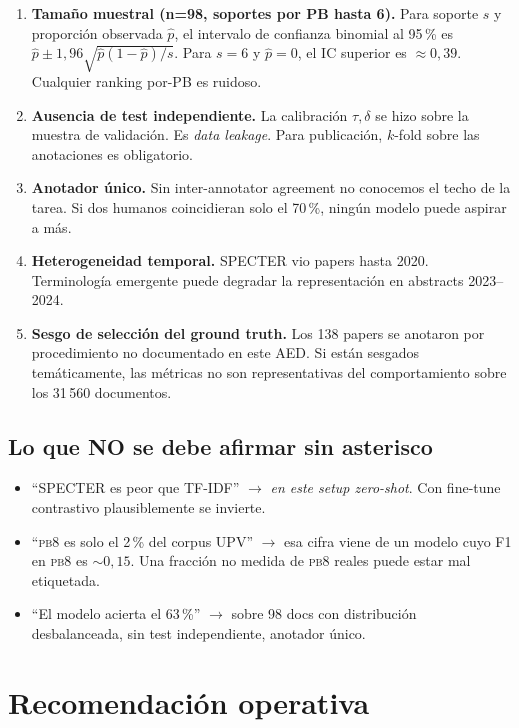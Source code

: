 \documentclass[11pt,a4paper]{article}
\newcommand{\pb}[1]{\textsc{pb#1}}
\begin{document}
\begin{enumerate}
\item \textbf{Tamaño muestral (n=98, soportes por PB hasta 6).} Para soporte $s$ y proporción observada $\hat{p}$, el intervalo de confianza binomial al 95\,\% es $\hat{p} \pm 1{,}96\sqrt{\hat{p}(1-\hat{p})/s}$. Para $s=6$ y $\hat{p}=0$, el IC superior es $\approx 0{,}39$. Cualquier ranking por-PB es ruidoso.
\item \textbf{Ausencia de test independiente.} La calibración $\tau, \delta$ se hizo sobre la muestra de validación. Es \emph{data leakage}. Para publicación, $k$-fold sobre las anotaciones es obligatorio.
\item \textbf{Anotador único.} Sin inter-annotator agreement no conocemos el techo de la tarea. Si dos humanos coincidieran solo el 70\,\%, ningún modelo puede aspirar a más.
\item \textbf{Heterogeneidad temporal.} SPECTER vio papers hasta 2020. Terminología emergente puede degradar la representación en abstracts 2023--2024.
\item \textbf{Sesgo de selección del ground truth.} Los 138 papers se anotaron por procedimiento no documentado en este AED. Si están sesgados temáticamente, las métricas no son representativas del comportamiento sobre los 31\,560 documentos.
\end{enumerate}

\subsection{Lo que NO se debe afirmar sin asterisco}

\begin{itemize}
\item ``SPECTER es peor que TF-IDF'' $\to$ \emph{en este setup zero-shot}. Con fine-tune contrastivo plausiblemente se invierte.
\item ``\pb8 es solo el 2\,\% del corpus UPV'' $\to$ esa cifra viene de un modelo cuyo F1 en \pb8 es $\sim 0{,}15$. Una fracción no medida de \pb8 reales puede estar mal etiquetada.
\item ``El modelo acierta el 63\,\%'' $\to$ sobre 98 docs con distribución desbalanceada, sin test independiente, anotador único.
\end{itemize}

\section{Recomendación operativa}\label{sec:recomendacion}
\end{document}
